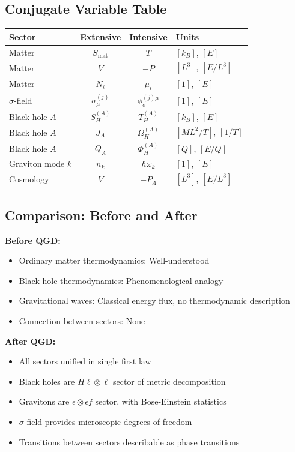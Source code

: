 \documentclass[11pt,a4paper]{article}
\theoremstyle{definition}
\theoremstyle{remark}
\begin{document}
	\subsection{Conjugate Variable Table}
	
	\begin{center}
		\begin{tabular}{l|c|c|l}
			\textbf{Sector} & \textbf{Extensive} & \textbf{Intensive} & \textbf{Units}\\
			\hline
			Matter & $S_{\text{mat}}$ & $T$ & $[k_B]$, $[E]$\\
			Matter & $V$ & $-P$ & $[L^3]$, $[E/L^3]$\\
			Matter & $N_i$ & $\mu_i$ & $[1]$, $[E]$\\
			\hline
			$\sigma$-field & $\sigma^{(j)}_\mu$ & $\phi_\sigma^{(j)\mu}$ & $[1]$, $[E]$\\
			\hline
			Black hole $A$ & $S_H^{(A)}$ & $T_H^{(A)}$ & $[k_B]$, $[E]$\\
			Black hole $A$ & $J_A$ & $\Omega_H^{(A)}$ & $[ML^2/T]$, $[1/T]$\\
			Black hole $A$ & $Q_A$ & $\Phi_H^{(A)}$ & $[Q]$, $[E/Q]$\\
			\hline
			Graviton mode $k$ & $n_k$ & $\hbar\omega_k$ & $[1]$, $[E]$\\
			\hline
			Cosmology & $V$ & $-P_\Lambda$ & $[L^3]$, $[E/L^3]$\\
			\hline
		\end{tabular}
	\end{center}
	
	\subsection{Comparison: Before and After}
	
	\textbf{Before QGD:}
	\begin{itemize}
		\item Ordinary matter thermodynamics: Well-understood
		\item Black hole thermodynamics: Phenomenological analogy
		\item Gravitational waves: Classical energy flux, no thermodynamic description
		\item Connection between sectors: None
	\end{itemize}
	
	\textbf{After QGD:}
	\begin{itemize}
		\item All sectors unified in single first law
		\item Black holes are $H\ell\otimes\ell$ sector of metric decomposition
		\item Gravitons are $\epsilon\otimes\epsilon f$ sector, with Bose-Einstein statistics
		\item $\sigma$-field provides microscopic degrees of freedom
		\item Transitions between sectors describable as phase transitions
	\end{itemize}
	
\end{document}
